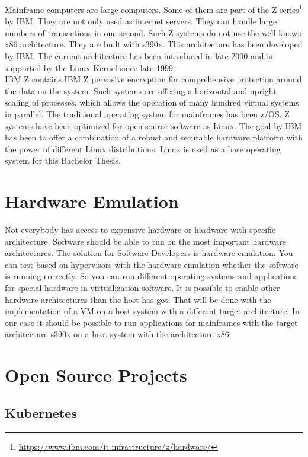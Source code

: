 Mainframe computers are large computers. Some of them are part of the Z series\footnote{\url{https://www.ibm.com/it-infrastructure/z/hardware/}} by IBM. They are not only used as internet servers. They can handle large numbers of transactions in one second\cite[~p.56]{Tanenbaum2014}. Such Z systems do not use the well known x86 architecture. They are built with s390x. This architecture has been developed by IBM. The current architecture has been introduced in late 2000 and is supported by the Linux Kernel since late 1999 \cite[~p.15]{Block2019}. \\
IBM Z contains IBM Z pervasive encryption for comprehensive protection around the data on the system\cite[~p.4]{Lascu2020}. Such systems are offering a horizontal and upright scaling of processes, which allows the operation of many hundred virtual systems in parallel\cite[~p.13]{Tschoeke2009}. The traditional operating system for mainframes has been z/OS. 
Z systems have been optimized for open-source software as Linux\cite[~p.8]{Lascu2020}. The goal by IBM has been to offer a combination of a robust and securable hardware platform with the power of different Linux distributions. 
Linux is used as a base operating system for this Bachelor Thesis.


\section{Hardware Emulation}

Not everybody has access to expensive hardware or hardware with  specific architecture. 
Software should be able to run on the most important hardware architectures. 
The solution for Software Developers is hardware emulation. 
You can test based on hypervisors with the hardware emulation whether the software is running correctly. 
So you can run different operating systems and applications for special hardware in virtualization software. 
It is possible to enable other hardware architectures than the host has got. 
That will be done with the implementation of a VM on a host system with a different target architecture\cite[~p.3]{Rosenthal2015}. 
In our case it should be possible to run applications for mainframes with the target architecture s390x on a host system with the architecture x86.

\section{Open Source Projects}

\subsection{Kubernetes}


